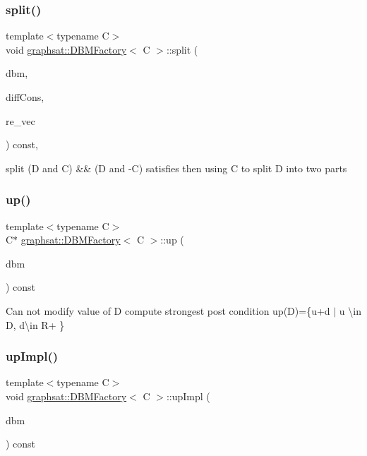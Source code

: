 \subsubsection{\texorpdfstring{split()}{split()}}
{\footnotesize\ttfamily template$<$typename C$>$ \\
void \mbox{\hyperlink{classgraphsat_1_1_d_b_m_factory}{graphsat\+::\+D\+B\+M\+Factory}}$<$ C $>$\+::split (\begin{DoxyParamCaption}\item[{C $\ast$}]{dbm,  }\item[{const vector$<$ \mbox{\hyperlink{classgraphsat_1_1_clock_constraint}{Clock\+Constraint}}$<$ C $>$$>$ \&}]{diff\+Cons,  }\item[{vector$<$ C $\ast$ $>$ \&}]{re\+\_\+vec }\end{DoxyParamCaption}) const\hspace{0.3cm}{\ttfamily [inline]}, {\ttfamily [private]}}

split (D and C) \&\& (D and -\/C) satisfies then using C to split D into two parts\mbox{\label{classgraphsat_1_1_d_b_m_factory_a3e5f7dfadf1c448c3a920d471962a354}} 
\subsubsection{\texorpdfstring{up()}{up()}}
{\footnotesize\ttfamily template$<$typename C$>$ \\
C$\ast$ \mbox{\hyperlink{classgraphsat_1_1_d_b_m_factory}{graphsat\+::\+D\+B\+M\+Factory}}$<$ C $>$\+::up (\begin{DoxyParamCaption}\item[{const C $\ast$const}]{dbm }\end{DoxyParamCaption}) const\hspace{0.3cm}{\ttfamily [inline]}}

Can not modify value of D compute strongest post condition up(\+D)=\{u+d $\vert$ u \textbackslash{}in D, d\textbackslash{}in R+ \} \mbox{\label{classgraphsat_1_1_d_b_m_factory_ab47c993ced812163852b176ac2b00110}} 
\subsubsection{\texorpdfstring{upImpl()}{upImpl()}}
{\footnotesize\ttfamily template$<$typename C$>$ \\
void \mbox{\hyperlink{classgraphsat_1_1_d_b_m_factory}{graphsat\+::\+D\+B\+M\+Factory}}$<$ C $>$\+::up\+Impl (\begin{DoxyParamCaption}\item[{C $\ast$}]{dbm }\end{DoxyParamCaption}) const\hspace{0.3cm}{\ttfamily [inline]}}



